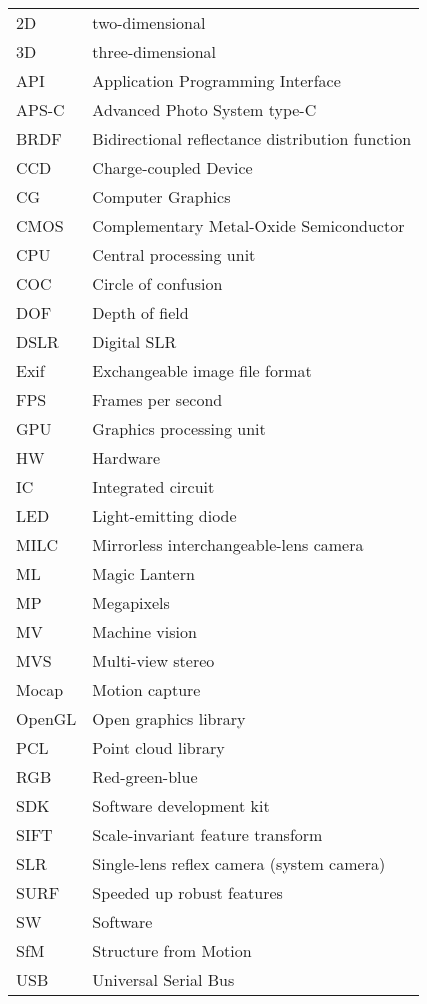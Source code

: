 \begin{tabular}{ll}
	2D & two-dimensional\\
	3D & three-dimensional\\
	API & Application Programming Interface\\
	APS-C & Advanced Photo System type-C\\
	BRDF & Bidirectional reflectance distribution function\\
	CCD & Charge-coupled Device\\
	CG & Computer Graphics\\
	CMOS & Complementary Metal-Oxide Semiconductor\\
	CPU & Central processing unit\\
	COC & Circle of confusion\\
	DOF & Depth of field\\
	DSLR & Digital SLR\\
	Exif & Exchangeable image file format\\
	FPS & Frames per second\\
	GPU & Graphics processing unit\\
	HW & Hardware\\
	IC & Integrated circuit\\
	LED & Light-emitting diode\\
	MILC & Mirrorless interchangeable-lens camera\\
	ML & Magic Lantern\\
	MP & Megapixels\\
	MV & Machine vision\\
	MVS & Multi-view stereo\\
	Mocap & Motion capture\\
	OpenGL & Open graphics library\\
	PCL & Point cloud library\\
	RGB & Red-green-blue\\
	SDK & Software development kit\\
	SIFT & Scale-invariant feature transform\\
	SLR & Single-lens reflex camera (system camera)\\
	SURF & Speeded up robust features \\
	SW & Software\\
	SfM & Structure from Motion\\
	USB & Universal Serial Bus\\
\end{tabular}

